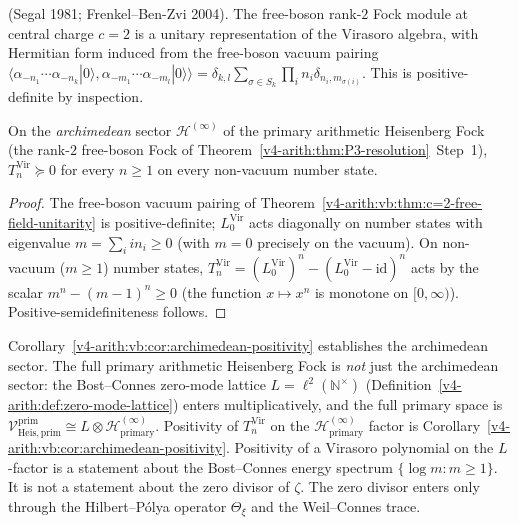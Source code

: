 \begin{theorem}[\(c=2\) free-field unitarity]
\label{v4-arith:vb:thm:c=2-free-field-unitarity}
(Segal 1981; Frenkel--Ben-Zvi 2004).
The free-boson rank-\(2\) Fock module at central charge \(c=2\) is a
unitary representation of the Virasoro algebra, with Hermitian form
induced from the free-boson vacuum pairing
\(\langle\alpha_{-n_{1}}\cdots\alpha_{-n_{k}}|0\rangle,\alpha_{-m_{1}}\cdots\alpha_{-m_{l}}|0\rangle\rangle=\delta_{k,l}\sum_{\sigma\in S_{k}}\prod_{i}n_{i}\delta_{n_{i},m_{\sigma(i)}}\).
This is positive-definite by inspection.
\end{theorem}

\begin{corollary}
\label{v4-arith:vb:cor:archimedean-positivity}
On the \emph{archimedean} sector
\(\mathcal{H}^{(\infty)}\) of the primary arithmetic Heisenberg Fock
(the rank-\(2\) free-boson Fock of
Theorem~\ref{v4-arith:thm:P3-resolution}~Step~1), \(T_{n}^{\mathrm{Vir}}\succeq 0\) for every
\(n\geq 1\) on every non-vacuum number state.
\end{corollary}

\begin{proof}
The free-boson vacuum pairing of Theorem~\ref{v4-arith:vb:thm:c=2-free-field-unitarity}
is positive-definite; \(L_{0}^{\mathrm{Vir}}\) acts diagonally on
number states with eigenvalue \(m=\sum_{i}i n_{i}\geq 0\) (with \(m=0\)
precisely on the vacuum). On non-vacuum (\(m\geq 1\)) number states,
\(T_{n}^{\mathrm{Vir}}=(L_{0}^{\mathrm{Vir}})^{n}-(L_{0}^{\mathrm{Vir}}-\mathrm{id})^{n}\) acts by the scalar
\(m^{n}-(m-1)^{n}\geq 0\) (the function \(x\mapsto x^{n}\) is monotone on
\([0,\infty)\)). Positive-semidefiniteness follows.
\end{proof}

\begin{remark}
\label{v4-arith:vb:rem:missing-sector}
Corollary~\ref{v4-arith:vb:cor:archimedean-positivity} establishes the
archimedean sector. The full primary arithmetic Heisenberg Fock is
\emph{not} just the archimedean sector: the Bost--Connes zero-mode
lattice \(L=\ell^{2}(\mathbb{N}^{\times})\)
(Definition~\ref{v4-arith:def:zero-mode-lattice}) enters multiplicatively, and
the full primary space is
\(\mathcal{V}^{\mathrm{prim}}_{\mathrm{Heis},\mathrm{prim}}\cong L\otimes\mathcal{H}^{(\infty)}_{\mathrm{primary}}\).
Positivity of \(T_{n}^{\mathrm{Vir}}\) on the \(\mathcal{H}^{(\infty)}_{\mathrm{primary}}\)
factor is Corollary~\ref{v4-arith:vb:cor:archimedean-positivity}. Positivity
of a Virasoro polynomial on the \(L\)-factor is a statement about the
Bost--Connes energy spectrum \(\{\log m:m\geq1\}\). It is not a
statement about the zero divisor of \(\zeta\). The zero divisor enters
only through the Hilbert--P\'olya operator \(\Theta_{\xi}\) and the
Weil--Connes trace.
\end{remark}

